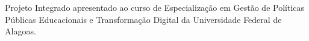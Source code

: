\documentclass[
  12pt,
  openright,
  oneside,
  a4paper,
  english,
  brazil
]{abntex2}
\begin{document}
\frenchspacing

\imprimircapa

\begin{folhaderosto}
  \begin{center}
    {\ABNTEXchapterfont\large \imprimirautor}
    \vspace*{\fill}

    {\ABNTEXchapterfont\bfseries\Large \imprimirtitulo}
    \vspace*{\fill}

    \hspace{.45\textwidth}
    \begin{minipage}{.5\textwidth}
      Projeto Integrado apresentado ao curso de Especialização em Gestão de
      Políticas Públicas Educacionais e Transformação Digital da Universidade
      Federal de Alagoas.

    \end{minipage}
    \vspace*{\fill}

    {\large \imprimirlocal}
    \par
    {\large \imprimirdata}
  \end{center}
\end{folhaderosto}
\end{document}
